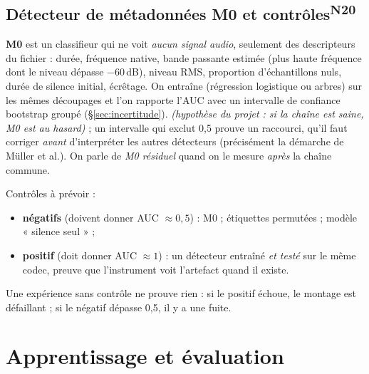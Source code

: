 \documentclass[10pt,a4paper]{article}
\newcommand{\hyp}[1]{\textit{(hypothèse du projet : #1)}}
\newcommand{\nref}[1]{\textsuperscript{\scriptsize\textcolor{black!55}{#1}}}
\begin{document}
\subsection{Détecteur de métadonnées M0 et contrôles\nref{N20}}
\textbf{M0} est un classifieur qui ne voit \emph{aucun signal audio}, seulement des descripteurs du fichier : durée, fréquence native, bande passante estimée (plus haute fréquence dont le niveau dépasse $-60$\,dB), niveau RMS, proportion d'échantillons nuls, durée de silence initial, écrêtage. On entraîne (régression logistique ou arbres) sur les mêmes découpages et l'on rapporte l'AUC avec un intervalle de confiance bootstrap groupé (§\ref{sec:incertitude}). \hyp{si la chaîne est saine, M0 est au hasard} ; un intervalle qui exclut 0,5 prouve un raccourci, qu'il faut corriger \emph{avant} d'interpréter les autres détecteurs (précisément la démarche de Müller et al.). On parle de \emph{M0 résiduel} quand on le mesure \emph{après} la chaîne commune.

Contrôles à prévoir :
\begin{itemize}
  \item \textbf{négatifs} (doivent donner AUC $\ensuremath{\approx}0{,}5$) : M0 ; étiquettes permutées ; modèle « silence seul » ;
  \item \textbf{positif} (doit donner AUC $\ensuremath{\approx}1$) : un détecteur entraîné \emph{et testé} sur le même codec, preuve que l'instrument voit l'artefact quand il existe.
\end{itemize}
Une expérience sans contrôle ne prouve rien : si le positif échoue, le montage est défaillant ; si le négatif dépasse 0,5, il y a une fuite.

\section{Apprentissage et évaluation}\label{sec:eval}
\end{document}
